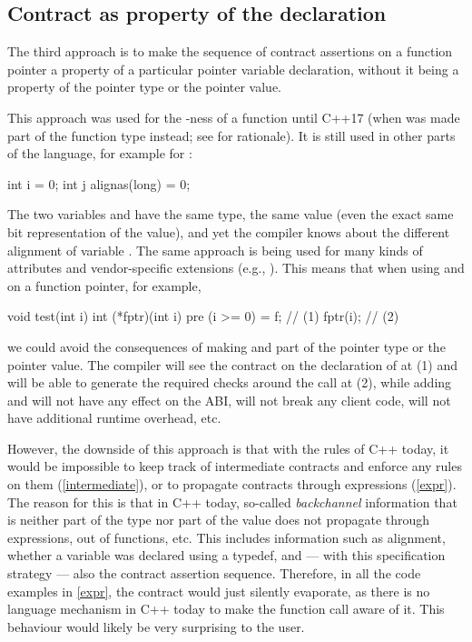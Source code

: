 
\subsection{Contract as property of the declaration}
\label{decl}

The third approach is to make the sequence of contract assertions on a function pointer a property of a particular pointer variable declaration, without it being a property of the pointer type or the pointer value.

This approach was used for the -ness of a function until C++17 (when  was made part of the function type instead; see \cite{P0012R1} for rationale). It is still used in other parts of the language, for example for :
\begin{codeblock}
int i = 0;
int j alignas(long) = 0;
\end{codeblock}
The two variables  and  have the same type, the same value (even the exact same bit representation of the value), and yet the compiler knows about the different alignment of variable . The same approach is being used for many kinds of attributes and vendor-specific extensions (e.g., ). This means that when using   and  on a function pointer, for example,
\begin{codeblock}
void test(int i) {
  int (*fptr)(int i) pre (i >= 0) = f;  // (1)
  fptr(i);  // (2)
}
\end{codeblock}
we could avoid the consequences of making   and  part of the pointer type or the pointer value. The compiler will see the contract on the declaration of  at (1) and will be able to generate the required checks around the call at (2), while adding  and  will not have any effect on the ABI, will not break any client code, will not have additional runtime overhead, etc.

However, the downside of this approach is that with the rules of C++ today, it would be impossible to keep track of intermediate contracts and enforce any rules on them (\ref{intermediate}), or to propagate contracts through expressions (\ref{expr}). The reason for this is that in C++ today, so-called \emph{backchannel} information that is neither part of the type nor part of the value does not propagate through expressions, out of functions, etc. This includes information such as alignment, whether a variable was declared using a typedef, and --- with this specification strategy --- also the contract assertion sequence. Therefore, in all the code examples in \ref{expr}, the contract would just silently evaporate, as there is no language mechanism in C++ today to make the function call aware of it. This behaviour would likely be very surprising to the user.


